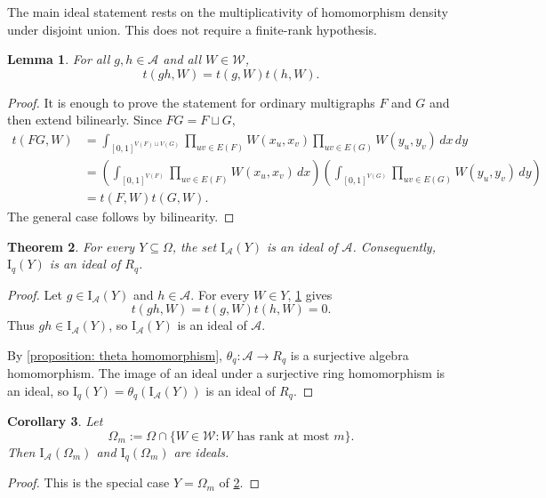 \documentclass[a4paper,12pt]{article}
\newtheorem{lemma}{Lemma}[section]
\newtheorem{theorem}[lemma]{Theorem}
\newtheorem{corollary}[lemma]{Corollary}
\theoremstyle{definition}
\newcommand\cW{\mathcal{W}}
\newcommand\cA{\mathcal{A}}
\newcommand\Iq{\mathrm{I}_{q}}
\newcommand\IA{\mathrm{I}_{\cA}}
\newcommand\Rq{R_q}
\newcommand\thetaq{\theta_q}
\begin{document}
The main ideal statement rests on the multiplicativity of homomorphism density under disjoint union. This does not require a finite-rank hypothesis.

\begin{lemma}\label{lemma: multiplicativity}
For all $g,h\in\cA$ and all $W\in\cW$,
\[
    t(gh,W)=t(g,W)t(h,W).
\]
\end{lemma}

\begin{proof}
It is enough to prove the statement for ordinary multigraphs $F$ and $G$ and then extend bilinearly. Since $FG=F\sqcup G$,
\begin{align*}
 t(FG,W)
&=\int_{[0,1]^{V(F)\sqcup V(G)}}
\prod_{uv\in E(F)}W(x_u,x_v)
\prod_{uv\in E(G)}W(y_u,y_v)\,dx\,dy\\
&=\left(
\int_{[0,1]^{V(F)}}
\prod_{uv\in E(F)}W(x_u,x_v)\,dx
\right)
\left(
\int_{[0,1]^{V(G)}}
\prod_{uv\in E(G)}W(y_u,y_v)\,dy
\right)\\
&=t(F,W)t(G,W).
\end{align*}
The general case follows by bilinearity.
\end{proof}

\begin{theorem}\label{theorem: vanishing ideals are ideals}
For every $Y\subseteq\Omega$, the set $\IA(Y)$ is an ideal of $\cA$. Consequently, $\Iq(Y)$ is an ideal of $\Rq$.
\end{theorem}

\begin{proof}
Let $g\in\IA(Y)$ and $h\in\cA$. For every $W\in Y$, \cref{lemma: multiplicativity} gives
\[
    t(gh,W)=t(g,W)t(h,W)=0.
\]
Thus $gh\in\IA(Y)$, so $\IA(Y)$ is an ideal of $\cA$.

By \cref{proposition: theta homomorphism}, $\thetaq:\cA\to\Rq$ is a surjective algebra homomorphism. The image of an ideal under a surjective ring homomorphism is an ideal, so $\Iq(Y)=\thetaq(\IA(Y))$ is an ideal of $\Rq$.
\end{proof}

\begin{corollary}\label{cor: hom ideal}
Let
\[
    \Omega_m:=\Omega\cap\{W\in\cW: W\text{ has rank at most }m\}.
\]
Then $\IA(\Omega_m)$ and $\Iq(\Omega_m)$ are ideals.
\end{corollary}

\begin{proof}
This is the special case $Y=\Omega_m$ of \cref{theorem: vanishing ideals are ideals}.
\end{proof}
\end{document}

